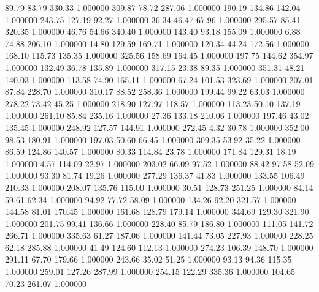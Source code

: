      89.79     83.79    330.33  1.000000
    309.87     78.72    287.06  1.000000
    190.19    134.86    142.04  1.000000
    243.75    127.19     92.27  1.000000
     36.34     46.47     67.96  1.000000
    295.57     85.41    320.35  1.000000
     46.76     54.66    340.40  1.000000
    143.40     93.18    155.09  1.000000
      6.88     74.88    206.10  1.000000
     14.80    129.59    169.71  1.000000
    120.34     44.24    172.56  1.000000
    168.10    115.73    135.35  1.000000
    325.56    158.69    164.45  1.000000
    197.75    144.62    354.97  1.000000
    132.49     36.78    135.89  1.000000
    317.15     23.38     89.35  1.000000
    351.31     48.21    140.03  1.000000
    113.58     74.90    165.11  1.000000
     67.24    101.53    323.69  1.000000
    207.01     87.84    228.70  1.000000
    310.17     88.52    258.36  1.000000
    199.44     99.22     63.03  1.000000
    278.22     73.42     45.25  1.000000
    218.90    127.97    118.57  1.000000
    113.23     50.10    137.19  1.000000
    261.10     85.84    235.16  1.000000
     27.36    133.18    210.06  1.000000
    197.46     43.02    135.45  1.000000
    248.92    127.57    144.91  1.000000
    272.45      4.32     30.78  1.000000
    352.00     98.53    180.91  1.000000
    197.03     50.60     66.45  1.000000
    309.35     53.92     35.22  1.000000
     86.59    124.86    140.57  1.000000
     80.33    114.84     23.78  1.000000
    171.84    129.31     18.19  1.000000
      4.57    114.09     22.97  1.000000
    203.02     66.09     97.52  1.000000
     88.42     97.58     52.09  1.000000
     93.30     81.74     19.26  1.000000
    277.29    136.37     41.83  1.000000
    133.55    106.49    210.33  1.000000
    208.07    135.76    115.00  1.000000
     30.51    128.73    251.25  1.000000
     84.14     59.61     62.34  1.000000
     94.92     77.72     58.09  1.000000
    134.26     92.20    321.57  1.000000
    144.58     81.01    170.45  1.000000
    161.68    128.79    179.14  1.000000
    344.69    129.30    321.90  1.000000
    201.75     99.41    136.66  1.000000
    228.40     85.79    186.80  1.000000
    111.05    141.72    266.71  1.000000
    335.63     61.27    187.06  1.000000
    141.44     73.05    227.93  1.000000
    228.25     62.18    285.88  1.000000
     41.49    124.60    112.13  1.000000
    274.23    106.39    148.70  1.000000
    291.11     67.70    179.66  1.000000
    243.66     35.02     51.25  1.000000
     93.13     94.36    115.35  1.000000
    259.01    127.26    287.99  1.000000
    254.15    122.29    335.36  1.000000
    104.65     70.23    261.07  1.000000
